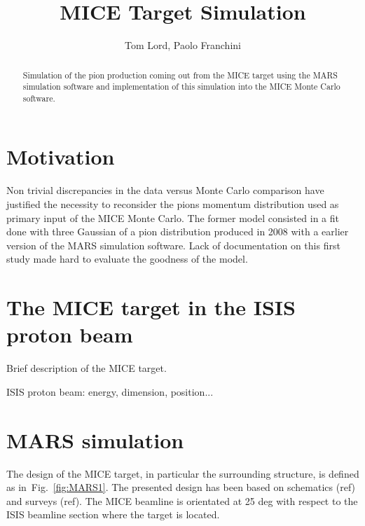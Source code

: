 \documentclass[a4paper,11pt]{article}
\title{MICE Target Simulation}
\author{Tom Lord, Paolo Franchini}
\begin{document}
\maketitle
\tableofcontents

\begin{abstract}
Simulation of the pion production coming out from the MICE target using the MARS simulation software and implementation of this simulation into the MICE Monte Carlo software.
\end{abstract}

\section{Motivation}

Non trivial discrepancies in the data versus Monte Carlo comparison have justified the necessity to reconsider the pions momentum distribution used as primary input of the MICE Monte Carlo.
The former model consisted in a fit done with three Gaussian of a pion distribution produced in 2008 with a earlier version of the MARS simulation software. Lack of documentation on this first study made hard to evaluate the goodness of the model. 

\section{The MICE target in the ISIS proton beam}

Brief description of the MICE target.

ISIS proton beam: energy, dimension, position...

\section{MARS simulation}

The design of the MICE target, in particular the surrounding structure, is defined as in~Fig.~\ref{fig:MARS1}. The presented design has been based on schematics (ref) and surveys (ref). The MICE beamline is orientated at 25 deg with respect to the ISIS beamline section where the target is located.
\end{document}
